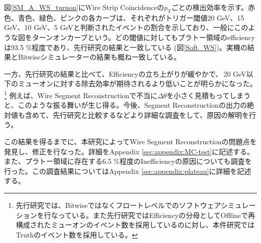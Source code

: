 図\ref{SM_A_WS_turnon}にWire Strip Coincidenceの$p_\mathrm{T}$ごとの検出効率を示す。赤色、青色、緑色、ピンクの各カーブは、それぞれがトリガー閾値20 GeV、15 GeV、10 GeV、5 GeVと判断されたイベントの割合を示しており、一般にこのような図をターンオンカーブという。どの\pt 閾値に対してもプラトー領域のefficiencyは93.5 \%程度であり、先行研究\cite{mt_kawamoto}の結果と一致している (図\ref{Soft_WS})。実機の結果とBitwiseシミュレーターの結果も概ね一致している。

一方、先行研究の結果と比べて、Efficiencyの立ち上がりが緩やかで、\pt $\,$20 GeV以下のミューオンに対する除去効率が期待されるより低いことが明らかになった。\footnote{先行研究では、Bitwiseではなくフロートレベルでのソフトウェアシミュレーションを行なっている。また先行研究ではEfficiencyの分母としてOfflineで再構成されたミューオンのイベント数を採用しているのに対し、本件研究ではTruthのイベント数を採用している。}
例えば、Wire Segment Reconstructionで不当に$\Delta\theta$を小さく見積もってしまうと、このような振る舞いが生じ得る。今後、Segment Reconstructionの出力の絶対値も含めて、先行研究と比較するなどより詳細な調査をして、原因の解明を行う。

この結果を得るまでに、本研究によってWire Segment Reconstructionの問題点を発見し、修正を行なった。詳細をAppendix \ref{sec:appendix:MC-test}に記述する。また、プラトー領域に存在する6.5 \%程度のInefficiencyの原因についても調査を行った。この調査結果についてはAppendix \ref{sec:appendix:plateau}に詳細を記述する。

